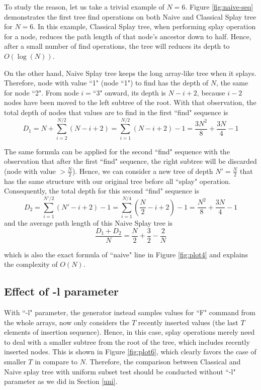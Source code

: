 \documentclass{article}
\begin{document}
To study the reason, let us take a trivial example of $N=6$. Figure \ref{fig:naive-seq} demonstrates the first tree find operations on both Naive and Classical Splay tree for $N=6$. In this example, Classical Splay tree, when performing splay operation for a node, reduces the path length of that node's ancestor down to half. Hence, after a small number of find operations, the tree will reduces its depth to $O(\log(N))$.

On the other hand, Naive Splay tree keeps the long array-like tree when it splays. Therefore, node with value ``1" (node ``1") to find has the depth of $N$, the same for node ``2". From node $i=$``3" onward, its depth is $N-i+2$, because $i-2$ nodes have been moved to the left subtree of the root. With that observation, the total depth of nodes that values are to find in the first ``find" sequence is $$D_1=N+\sum_{i=2}^{N/2}(N-i+2)=\sum_{i=1}^{N/2}(N-i+2)-1=\frac{3N^2}{8}+\frac{3N}{4}-1$$

The same formula can be applied for the second ``find" sequence with the observation that after the first ``find" sequence, the right subtree will be discarded (node with value $>\frac{N}{2}$). Hence, we can consider a new tree of depth $N'=\frac{N}{2}$ that has the same structure with our original tree before all ``splay" operation. Consequently, the total depth for this second ``find" sequence is
$$D_2=\sum_{i=1}^{N'/2}(N'-i+2)-1=\sum_{i=1}^{N/4}\left(\frac{N}{2}-i+2\right)-1=\frac{N^2}{8}+\frac{3N}{4}-1$$
and the average path length of this Naive Splay tree is
$$\frac{D_1+D_2}{N}=\frac{N}{2}+\frac{3}{2}-\frac{2}{N}$$

which is also the exact formula of ``naive" line in Figure \ref{fig:plot4} and explains the complexity of $O(N)$.


\subsection*{Effect of -l parameter}

With ``-l" parameter, the generator instead samples values for ``F" command from the whole arrays, now only considers the $T$ recently inserted values (the last $T$ elements of insertion sequence). Hence, in this case, splay operations merely need to deal with a smaller subtree from the root of the tree, which includes recently inserted nodes. This is shown in Figure \ref{fig:plot6}, which clearly favors the case of smaller $T$ in compare to $N$. Therefore, the comparison between Classical and Naive splay tree with uniform subset test should be conducted without ``-l" parameter as we did in Section \ref{uni}.
\end{document}
